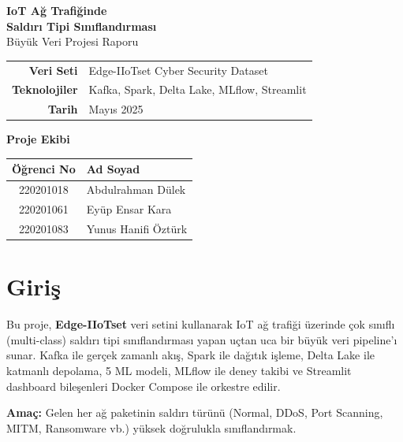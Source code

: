 \documentclass[12pt,a4paper]{article}
\begin{document}
\begin{titlepage}
\centering
\vspace*{3cm}
{\LARGE\bfseries IoT Ağ Trafiğinde\\[6pt]Saldırı Tipi Sınıflandırması}\\[1.2cm]
{\Large Büyük Veri Projesi Raporu}\\[2.5cm]
\begin{tabular}{rl}
\textbf{Veri Seti}    & Edge-IIoTset Cyber Security Dataset \\[4pt]
\textbf{Teknolojiler} & Kafka, Spark, Delta Lake, MLflow, Streamlit \\[4pt]
\textbf{Tarih}        & Mayıs 2025 \\
\end{tabular}

\vspace{2cm}
{\large\textbf{Proje Ekibi}}\\[0.5cm]
\begin{tabular}{cl}
\toprule
\textbf{Öğrenci No} & \textbf{Ad Soyad} \\
\midrule
220201018 & Abdulrahman Dülek \\
220201061 & Eyüp Ensar Kara \\
220201083 & Yunus Hanifi Öztürk \\
\bottomrule
\end{tabular}
\vfill
\end{titlepage}

\tableofcontents
\newpage

\section{Giriş}

Bu proje, \textbf{Edge-IIoTset} veri setini kullanarak IoT ağ trafiği üzerinde çok sınıflı (multi-class) saldırı tipi sınıflandırması yapan uçtan uca bir büyük veri pipeline'ı sunar. Kafka ile gerçek zamanlı akış, Spark ile dağıtık işleme, Delta Lake ile katmanlı depolama, 5 ML modeli, MLflow ile deney takibi ve Streamlit dashboard bileşenleri Docker Compose ile orkestre edilir.

\textbf{Amaç:} Gelen her ağ paketinin saldırı türünü (Normal, DDoS, Port Scanning, MITM, Ransomware vb.) yüksek doğrulukla sınıflandırmak.
\end{document}
